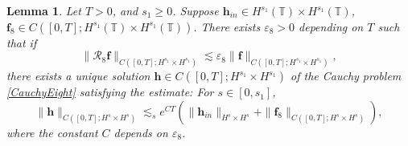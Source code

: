 \documentclass[10pt,a4paper]{amsart}
\newtheorem{lemma}{Lemma}
\newcommand{\T}{{\mathbb T}}
\newcommand{\mR}{\mathcal{R}}
\begin{document}
\begin{lemma} \label{t:CauchyEight}
Let $T>0$, and $s_1\geq 0$.
Suppose $\mathbf{h}_{in} \in H^{s_1}(\T)\times H^{s_1}(\T)$, $\mathbf{f}_8\in C([0,T];H^{s_1}(\T)\times H^{s_1}(\T))$.
There exists $\varepsilon_8>0$ depending on $T$ such that if 
\begin{equation*}
 \|\mR_8 \mathbf{f} \|_{C([0,T];H^{s_1}\times H^{s_1})} \lesssim \varepsilon_8 \|\mathbf{f}\|_{C([0,T];H^{s_1}\times H^{s_1})},
\end{equation*}
there exists a unique solution $\mathbf{h}\in C([0,T];H^{s_1}\times H^{s_1})$ of the Cauchy problem \eqref{CauchyEight} satisfying the estimate:
For $s\in [0, s_1]$, 
\begin{equation} \label{mR8EnergyEst}
 \| \mathbf{h}\|_{C([0,T]; H^s\times H^s)} \lesssim_s e^{CT}\left(\|\mathbf{h}_{in} \|_{H^s\times H^s} + \| \mathbf{f}_8\|_{C([0,T]; H^s\times H^s)}\right), 
\end{equation}
where the constant $C$ depends on $\varepsilon_8$.
\end{lemma}
\end{document}
